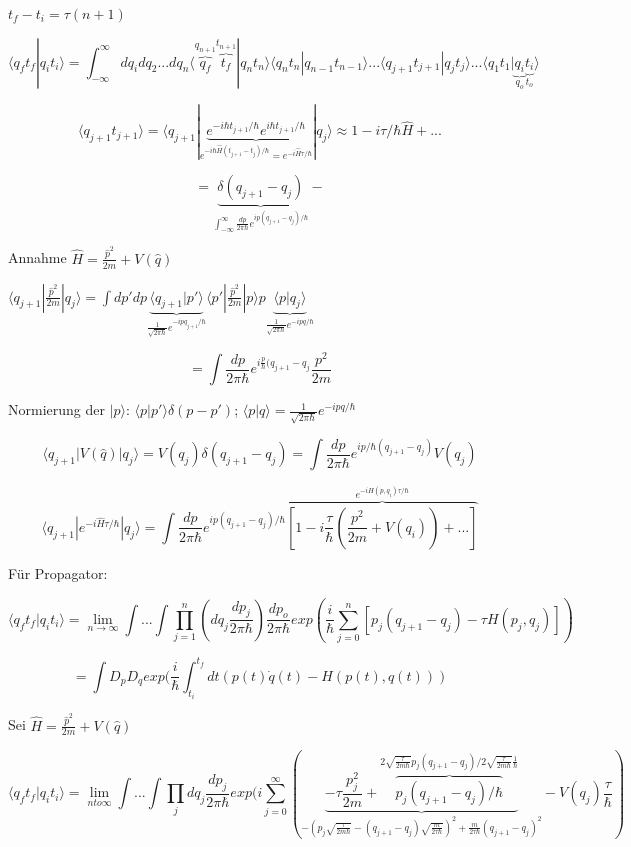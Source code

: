 \(t_f-t_i = \tau(n+1)\)

\[ \langle q_ft_f|q_it_i\rangle =\int_{-\infty}^{\infty} dq_idq_2...dq_n\langle \overbrace{q_f}^{q_{n+1}}\overbrace{t_f}^{t_{n+1}}|q_nt_n\rangle \langle q_n t_n|q_{n-1}t_{n-1}\rangle...\langle q_{j+1}t_{j+1}|q_jt_j\rangle ...\langle q_1t_1|\underbrace{q_i}_{q_o}\underbrace{t_i}_{t_o}\rangle  \]

\[ \langle q_{j+1}t_{j+1}\rangle = \langle q_{j+1}|\underbrace{e^{-i\hbar t_{j+1}/\hbar}e^{i\hbar t_{j+1}/\hbar}}_{e^{-i\hbar \hat H (t_{j+1}-t_j)/\hbar}=e^{-i\hat H\tau/\hbar}}|q_j\rangle\approx 1-i\tau/\hbar \hat H + ... \]

\[=\underbrace{\delta(q_{j+1}-q_j)}_{\int_{-\infty}^{\infty}\frac{dp}{2\pi\hbar}e^{ip(q_{j+1}-q_j)/\hbar}}-\]

Annahme \(\hat H = \frac{\hat p^2}{2m}+V(\hat q)\)

\( \langle q_{j+1}|  \frac{\hat p^2}{2m} |q_j\rangle =\int dp'dp \underbrace{\langle q_{j+1}|p'\rangle}_{\frac{1}{\sqrt{2\pi\hbar}}e^{-ipq_{j+1}/\hbar}} \langle p'| \frac{\hat p^2}{2m} |p\rangle p \underbrace{\langle p|q_j\rangle}_{ \frac{1}{\sqrt{2\pi\hbar}}e^{-ipq/\hbar}} \)

\[  = \int \frac{dp}{2\pi \hbar}e^{i\frac{p}{\hbar}(q_{j+1}-q_j}\frac{p^2}{2m}\]


Normierung der \(|p\rangle \): \(\langle p|p'\rangle \delta (p-p')\); \(\langle p|q\rangle = \frac{1}{\sqrt{2\pi\hbar}}e^{-ipq/\hbar}\)


\[ \langle q_{j+1}|V(\hat q)| q_j\rangle  = V(q_j) \delta(q_{j+1}-q_j) = \int \frac{dp}{2\pi \hbar}e^{ip/\hbar(q_{j+1}-q_j)}V(q_j) \]

\[\langle q_{j+1}|e^{-i\hat H\tau/\hbar}|q_j\rangle = \int  \frac{dp}{2\pi \hbar} e^{ip(q_{j+1}-q_j)/\hbar}\overbrace{[1-i\frac{\tau}{\hbar}(\frac{p^2}{2m}+V(q_i))+...]}^{e^{-iH(p,q_i)\tau/\hbar}}\]

Für Propagator: 

\[\langle q_ft_f|q_it_i\rangle = \lim_{n \to \infty}\int...\int \prod_{j=1}^n(dq_j\frac{dp_j}{2\pi\hbar})\frac{dp_o}{2\pi\hbar}exp(\frac{i}{\hbar}\sum_{j=0}^n[p_j(q_{j+1}-q_j)-\tau H(p_j,q_j)])\]

\[= \int D_pD_q exp(\frac{i}{\hbar}\int_{t_i}^{t_f}dt(p(t)\dot q(t) - H(p(t),q(t)))\]

Sei \(\hat H = \frac{\hat p^2}{2m}+V(\hat q)\)

\[\langle q_f t_f|q_it_i\rangle = \lim_{n to \infty}\int...\int \prod_j dq_j \frac{dp_j}{2\pi \hbar} exp(i\sum_{j=0}^\infty(\underbrace{-\tau\frac{p^2_j}{2m}+\overbrace{p_j(q_{j+1}-q_j)/\hbar}^{2\sqrt{\frac{\tau}{2m\hbar}}p_j(q_{j+1}-q_j)/2\sqrt{\frac{\tau}{2m\hbar}}\frac{1}{\hbar}}}_{-(p_j\sqrt{\frac{\tau}{2m\hbar}}-(q_{j+1}-q_j)\sqrt{\frac{m}{2\tau\hbar}} )^2+\frac{m}{2\tau\hbar}(q_{j+1}-q_j)^2} - V(q_j)\frac{\tau}{\hbar})\]

